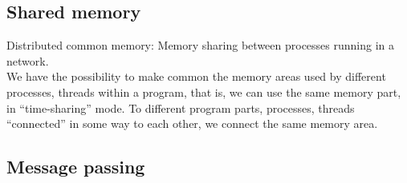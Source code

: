\documentclass[margin=0px]{article}
\begin{document}
\subsection{Shared memory}

Distributed common memory: Memory sharing between processes running in a network. \\
We have the possibility to make common the memory areas used by different processes, threads within a program, that is, we can use the same memory part, in ``time-sharing'' mode. To different program parts, processes, threads ``connected'' in some way to each other, we connect the same memory area.

\subsection{Message passing}
\end{document}
